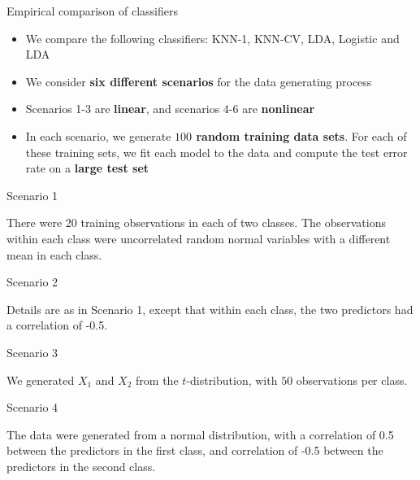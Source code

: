 \documentclass[14pt]{beamer}
\begin{document}
\begin{frame}{\large Empirical comparison of classifiers}

\begin{itemize}
	\item We compare the following classifiers: \alert{KNN-1}, \alert{KNN-CV}, \alert{LDA}, \alert{Logistic} and \alert{LDA}
	\item We consider \textbf{six different scenarios} for the data generating process
	\item Scenarios 1-3 are \textbf{linear}, and scenarios 4-6 are \textbf{nonlinear}
	\item In each scenario, we generate \textbf{$100$ random training data sets}. For each of these training sets, we fit each model to the data and compute the test error rate on a \textbf{large test set}
\end{itemize}


\end{frame}

\begin{frame}{Scenario 1}

{\small There were 20 training observations in each of two classes. The observations within each class were uncorrelated random normal variables with a different mean in each class.}

	
\end{frame}

\begin{frame}{Scenario 2}

Details are as in Scenario 1, except that within each class, the two predictors had a correlation of -0.5.


	
\end{frame}

\begin{frame}{Scenario 3}

We generated $X_1$ and $X_2$ from the $t$-distribution, with $50$ observations per class.

	
\end{frame}

\begin{frame}{Scenario 4}

The data were generated from a normal distribution, with a correlation of 0.5 between the predictors in the first class, and correlation of -0.5 between the predictors in the second class.

	
\end{frame}
\end{document}
